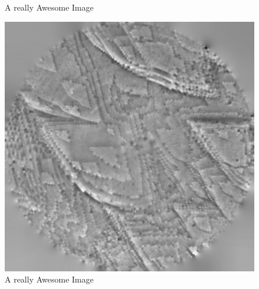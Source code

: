 \begin{figure}[!ht]
  \caption{A really Awesome Image}\label{fig:cd2}
\endminipage\hfill
{}%
  \includegraphics[width=\linewidth]{images/006_X10s50l10m_MOv2_290.png}
  \caption{A really Awesome Image}\label{fig:cd3}
\endminipage

\end{figure}


